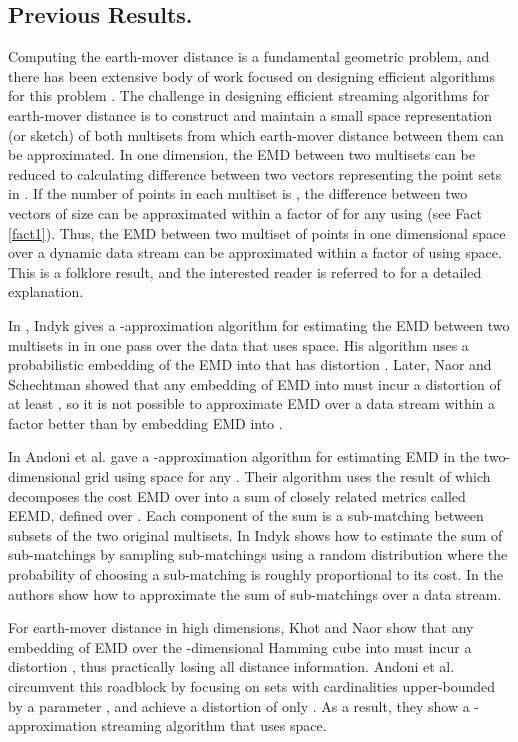 \documentclass[oribibl]{llncs}
\begin{document}
\subsection{Previous Results.}
Computing the earth-mover distance is a fundamental geometric problem, and
there has been extensive body of work focused on designing efficient algorithms
for this problem \cite{lawler, vai89, charikar, thaper, av04, eps_matching}.
The challenge in designing efficient streaming algorithms for earth-mover
distance is to construct and maintain a small space representation (or sketch)
of both multisets from which earth-mover distance between them can be
approximated.  In one dimension, the EMD between two multisets
can be reduced to calculating  difference between two vectors
representing the point sets in . If the number of points in each
multiset is , the  difference between two vectors of size 
can be approximated within a factor of  for any  using
 (see Fact \ref{fact1}). Thus, the EMD between
two multiset of points in one dimensional space over a dynamic data stream can
be approximated within a factor of  using
 space.
This is a folklore result, and the interested reader is referred to
\cite{emdgraphmetrics} for a detailed explanation.

In \cite{ind04}, Indyk gives a -approximation
algorithm for estimating the EMD between two multisets in  in one
pass over the data that uses  space.
His algorithm uses a probabilistic embedding of the EMD into  that
has  distortion \cite{thaper, charikar}.
Later, Naor and Schechtman \cite{naor} showed that any embedding of EMD into
 must incur a distortion of at least , so 
it is not possible to approximate EMD over a data stream within a factor better
than  by embedding EMD into . 

In \cite{const-approx} Andoni et al. gave a -approximation
algorithm for estimating EMD in the two-dimensional grid  using space
 for any . 
Their algorithm uses the result of \cite{ind07}
which decomposes the cost EMD over  into a sum of closely related
metrics called EEMD, defined over . Each component of the
sum is a sub-matching between subsets of the two original multisets. 
In \cite{ind07} Indyk shows how to estimate the sum of sub-matchings by sampling
sub-matchings using a random distribution where the probability of choosing a
sub-matching is roughly proportional to its cost. In \cite{const-approx} the
authors show how to approximate the sum of sub-matchings over a data stream.

For earth-mover distance in high dimensions, Khot and Naor \cite{kn06} show
that any embedding of EMD over the -dimensional Hamming
cube into  must incur a distortion , thus practically
losing all distance information. Andoni et al. \cite{kraught08} circumvent this
roadblock by focusing on sets with cardinalities upper-bounded by a parameter
, and achieve a distortion of only .
As a result, they show a -approximation
streaming algorithm that uses  space.   
\end{document}
